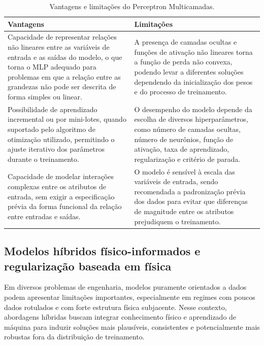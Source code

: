 \begin{table}[H]
\centering
\caption[Vantagens e limitações do Perceptron Multicamadas]{Vantagens e limitações do Perceptron Multicamadas.}
\label{tab:vantagens_limitacoes_mlp}
\begin{tabular}{p{6.5cm} p{7.5cm}}
\hline
\textbf{Vantagens} & \textbf{Limitações} \\
\hline

Capacidade de representar relações não lineares entre as variáveis de entrada e as saídas do modelo, o que torna o MLP adequado para problemas em que a relação entre as grandezas não pode ser descrita de forma simples ou linear.
&
A presença de camadas ocultas e funções de ativação não lineares torna a função de perda não convexa, podendo levar a diferentes soluções dependendo da inicialização dos pesos e do processo de treinamento. \\

Possibilidade de aprendizado incremental ou por mini-lotes, quando suportado pelo algoritmo de otimização utilizado, permitindo o ajuste iterativo dos parâmetros durante o treinamento.
&
O desempenho do modelo depende da escolha de diversos hiperparâmetros, como número de camadas ocultas, número de neurônios, função de ativação, taxa de aprendizado, regularização e critério de parada. \\

Capacidade de modelar interações complexas entre os atributos de entrada, sem exigir a especificação prévia da forma funcional da relação entre entradas e saídas.
&
O modelo é sensível à escala das variáveis de entrada, sendo recomendada a padronização prévia dos dados para evitar que diferenças de magnitude entre os atributos prejudiquem o treinamento. \\

\hline
\end{tabular}
\end{table}
\subsection{Modelos híbridos físico-informados e regularização baseada em física}
\label{sec:modelos-hibridos}

Em diversos problemas de engenharia, modelos puramente orientados a dados podem apresentar limitações importantes, especialmente em regimes com poucos dados rotulados e com forte estrutura física subjacente. Nesse contexto, abordagens híbridas buscam integrar conhecimento físico e aprendizado de máquina para induzir soluções mais plausíveis, consistentes e potencialmente mais robustas fora da distribuição de treinamento.

